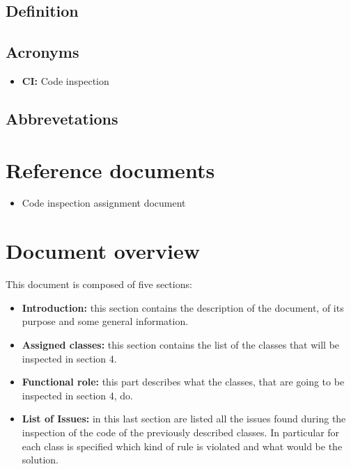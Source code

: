 \subsection{Definition}

\subsection{Acronyms}

\begin{itemize}
\item \textbf{CI:} Code inspection
\end{itemize}

\subsection{Abbrevetations}

\section{Reference documents}

\begin{itemize}
\item Code inspection assignment document
\end{itemize}

\section{Document overview}
This document is composed of five sections:
\begin{itemize}
\item \textbf{Introduction:} this section contains the description of the document, of its purpose and some general information.
\item \textbf{Assigned classes:} this section contains the list of the classes that will be inspected in section 4.
\item \textbf{Functional role:} this part describes what the classes, that are going to be inspected in section 4, do.
\item \textbf{List of Issues:} in this last section are listed all the issues found during the inspection of the code of the previously described classes. In particular for each class is specified which kind of rule is violated and what would be the solution.
\end{itemize}

